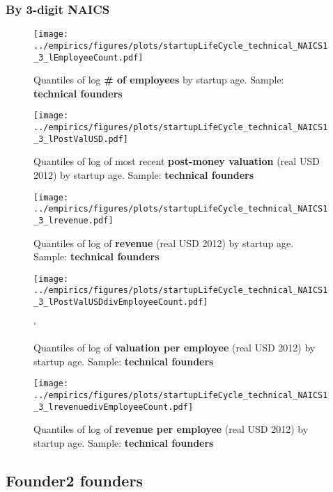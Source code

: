 \documentclass[12pt,english]{article}
\theoremstyle{remark}
\let\Oldsubsection\subsection
\renewcommand{\subsection}{\FloatBarrier\Oldsubsection}
\let\Oldsubsubsection\subsubsection
\renewcommand{\subsubsection}{\FloatBarrier\Oldsubsubsection}
\begin{document}
\subsubsection{By 3-digit NAICS}

\begin{figure}[!htb]
	\centering
	\texttt{[image: ../empirics/figures/plots/startupLifeCycle\_technical\_NAICS1\_3\_lEmployeeCount.pdf]}
	\caption{Quantiles of log \textbf{\# of employees} by startup age. 
		Sample: \textbf{technical founders}}
\end{figure}

\begin{figure}[!htb]
	\centering
	\texttt{[image: ../empirics/figures/plots/startupLifeCycle\_technical\_NAICS1\_3\_lPostValUSD.pdf]}
	\caption{Quantiles of log of most recent \textbf{post-money valuation} (real USD 2012) by startup age. 
		Sample: \textbf{technical founders}}
\end{figure}

\begin{figure}[!htb]
	\centering
	\texttt{[image: ../empirics/figures/plots/startupLifeCycle\_technical\_NAICS1\_3\_lrevenue.pdf]}
	\caption{Quantiles of log of \textbf{revenue} (real USD 2012) by startup age. 
		Sample: \textbf{technical founders}}
\end{figure}

\begin{figure}[!htb]
	\centering
	\texttt{[image: ../empirics/figures/plots/startupLifeCycle\_technical\_NAICS1\_3\_lPostValUSDdivEmployeeCount.pdf]}
	\caption{Quantiles of log of \textbf{valuation per employee} (real USD 2012) by startup age. 
		Sample: \textbf{technical founders}}`
\end{figure}

\begin{figure}[!htb]
	\centering
	\texttt{[image: ../empirics/figures/plots/startupLifeCycle\_technical\_NAICS1\_3\_lrevenuedivEmployeeCount.pdf]}
	\caption{Quantiles of log of \textbf{revenue per employee} (real USD 2012) by startup age. 
		Sample: \textbf{technical founders}}
\end{figure}







\subsection{Founder2 founders}
\end{document}

